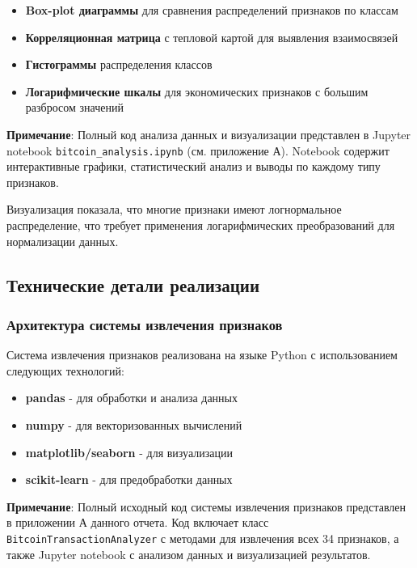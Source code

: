 \begin{itemize}
    \item \textbf{Box-plot диаграммы} для сравнения распределений признаков по классам
    \item \textbf{Корреляционная матрица} с тепловой картой для выявления взаимосвязей
    \item \textbf{Гистограммы} распределения классов
    \item \textbf{Логарифмические шкалы} для экономических признаков с большим разбросом значений
\end{itemize}

\textbf{Примечание}: Полный код анализа данных и визуализации представлен в Jupyter notebook \texttt{bitcoin\_analysis.ipynb} (см. приложение А). Notebook содержит интерактивные графики, статистический анализ и выводы по каждому типу признаков.

Визуализация показала, что многие признаки имеют логнормальное распределение, что требует применения логарифмических преобразований для нормализации данных.

\subsection{Технические детали реализации}

\subsubsection{Архитектура системы извлечения признаков}

Система извлечения признаков реализована на языке Python с использованием следующих технологий:

\begin{itemize}
    \item \textbf{pandas} - для обработки и анализа данных
    \item \textbf{numpy} - для векторизованных вычислений
    \item \textbf{matplotlib/seaborn} - для визуализации
    \item \textbf{scikit-learn} - для предобработки данных
\end{itemize}

\textbf{Примечание}: Полный исходный код системы извлечения признаков представлен в приложении А данного отчета. Код включает класс \texttt{BitcoinTransactionAnalyzer} с методами для извлечения всех 34 признаков, а также Jupyter notebook с анализом данных и визуализацией результатов.

